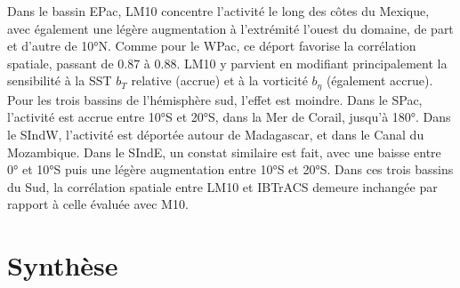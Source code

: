 \documentclass[../main.tex]{subfiles}
\begin{document}
Dans le bassin EPac, LM10 concentre l'activité le long des côtes du Mexique, avec également une légère augmentation à l'extrémité l'ouest du domaine, de part et
d'autre de \ang{10}N. Comme pour le WPac, ce déport favorise la corrélation spatiale, passant de \num{0.87} à \num{0.88}. LM10 y parvient en modifiant
principalement la sensibilité à la SST $b_T$ relative (accrue) et à la vorticité $b_\eta$ (également accrue). Pour les trois bassins de l'hémisphère sud,
l'effet est moindre. Dans le SPac, l'activité est accrue entre \ang{10}S et \ang{20}S, dans la Mer de Corail, jusqu'à \ang{180}. Dans le SIndW, l'activité est
déportée autour de Madagascar, et dans le Canal du Mozambique. Dans le SIndE, un constat similaire est fait, avec une baisse entre \ang{0} et \ang{10}S puis une
légère augmentation entre \ang{10}S et \ang{20}S. Dans ces trois bassins du Sud, la corrélation spatiale entre LM10 et IBTrACS demeure inchangée par rapport à
celle évaluée avec M10.

%
%
%
%


\section{Synthèse}
\end{document}
